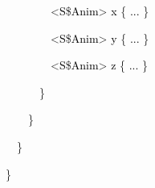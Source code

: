 \documentclass[a4paper]{article}
\newcommand\textstyleOOoComputerKeyWord[1]{\textrm{\textcolor[rgb]{0.0,0.0,0.5019608}{#1}}}
\newcommand\textstyleOOoAssemblerSpecialChar[1]{\textrm{\textcolor[rgb]{0.0,0.5019608,0.0}{#1}}}
\newcommand\textstyleOOoAssemblerIdent[1]{\textrm{\textcolor{black}{#1}}}
\begin{document}
{\color{black}
\textstyleOOoComputerKeyWord{\textcolor{black}{\ \ \ \ \ \ \ \ \ \ \ \ }}\textstyleOOoAssemblerSpecialChar{{\textless}}\textstyleOOoAssemblerIdent{S}\textstyleOOoAssemblerSpecialChar{\$}\textstyleOOoAssemblerIdent{Anim}\textstyleOOoAssemblerSpecialChar{{\textgreater}}\textstyleOOoComputerKeyWord{\textcolor{black}{
}}\textstyleOOoAssemblerIdent{x}\textstyleOOoComputerKeyWord{\textcolor{black}{
}}\textstyleOOoAssemblerSpecialChar{\{}\textstyleOOoComputerKeyWord{\textcolor{black}{
}}\textstyleOOoAssemblerIdent{...}\textstyleOOoComputerKeyWord{\textcolor{black}{
}}\textstyleOOoAssemblerSpecialChar{\}}}

{\color{black}
\textstyleOOoComputerKeyWord{\textcolor{black}{\ \ \ \ \ \ \ \ \ \ \ \ }}\textstyleOOoAssemblerSpecialChar{{\textless}}\textstyleOOoAssemblerIdent{S}\textstyleOOoAssemblerSpecialChar{\$}\textstyleOOoAssemblerIdent{Anim}\textstyleOOoAssemblerSpecialChar{{\textgreater}}\textstyleOOoComputerKeyWord{\textcolor{black}{
}}\textstyleOOoAssemblerIdent{y}\textstyleOOoComputerKeyWord{\textcolor{black}{
}}\textstyleOOoAssemblerSpecialChar{\{}\textstyleOOoComputerKeyWord{\textcolor{black}{
}}\textstyleOOoAssemblerIdent{...}\textstyleOOoComputerKeyWord{\textcolor{black}{
}}\textstyleOOoAssemblerSpecialChar{\}}}

{\color{black}
\textstyleOOoComputerKeyWord{\textcolor{black}{\ \ \ \ \ \ \ \ \ \ \ \ }}\textstyleOOoAssemblerSpecialChar{{\textless}}\textstyleOOoAssemblerIdent{S}\textstyleOOoAssemblerSpecialChar{\$}\textstyleOOoAssemblerIdent{Anim}\textstyleOOoAssemblerSpecialChar{{\textgreater}}\textstyleOOoComputerKeyWord{\textcolor{black}{
}}\textstyleOOoAssemblerIdent{z}\textstyleOOoComputerKeyWord{\textcolor{black}{
}}\textstyleOOoAssemblerSpecialChar{\{}\textstyleOOoComputerKeyWord{\textcolor{black}{
}}\textstyleOOoAssemblerIdent{...}\textstyleOOoComputerKeyWord{\textcolor{black}{
}}\textstyleOOoAssemblerSpecialChar{\}}}

{\color{black}
\textstyleOOoComputerKeyWord{\textcolor{black}{\ \ \ \ \ \ \ \ \ \ }}\textstyleOOoAssemblerSpecialChar{\}}}

{\color{black}
\textstyleOOoComputerKeyWord{\textcolor{black}{\ \ \ \ \ \ \ \ }}\textstyleOOoAssemblerSpecialChar{\}}}

{\color{black}
\textstyleOOoComputerKeyWord{\textcolor{black}{\ \ \ \ \ \ }}\textstyleOOoAssemblerSpecialChar{\}}}

{\color{black}
\textstyleOOoComputerKeyWord{\textcolor{black}{\ \ \ \ }}\textstyleOOoAssemblerSpecialChar{\}}}
\end{document}

